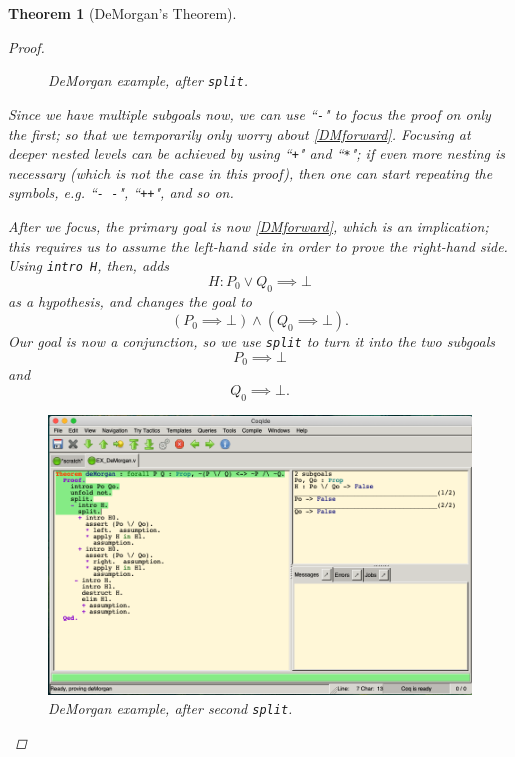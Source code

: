 \documentclass[12pt,notitlepage]{report}
\theoremstyle{plain}
\newtheorem{theo}{Theorem}[section]
\theoremstyle{definition}
\newcommand{\define}[1]{\emph{#1}\index{#1}}
\numberwithin{equation}{section}
\begin{document}
\begin{theo}[DeMorgan's Theorem]
\begin{proof}
\begin{figure}[H]
              \caption{DeMorgan example, after \texttt{split}.}
    \label{fig:demorgan1}
\end{figure}
        \par \medskip
        Since we have multiple subgoals now, we can use ``\texttt{-}" to \define{focus} the proof on only the first; so that we temporarily only worry about \eqref{DMforward}.  Focusing at deeper nested levels can be achieved by using ``\texttt{+}" and ``\texttt{*}"; if even more nesting is necessary (which is not the case in this proof), then one can start repeating the symbols, e.g. ``\texttt{-\,-}", ``\texttt{++}", and so on.
        \par After we focus, the primary goal is now \eqref{DMforward}, which is an implication; this requires us to assume the left-hand side in order to prove the right-hand side.  Using \texttt{intro H}, then, adds
        \[
            H : P_0 \lor Q_0 \implies \bot
        \]
        as a hypothesis, and changes the goal to 
        \[
            (P_0 \implies \bot) \land (Q_0 \implies \bot).
        \]
        Our goal is now a conjunction, so we use \texttt{split} to turn it into the two subgoals
        \begin{equation}\label{DMx1}
           P_0 \implies \bot
        \end{equation}
        and
        \begin{equation}\label{DMx2}
            Q_0 \implies \bot.
        \end{equation}
        \par \medskip
          \noindent
\begin{figure}[H]
    \centering
          \includegraphics[scale=0.45]{DeMorgan3}
              \caption{DeMorgan example, after second \texttt{split}.}

\end{figure}
\end{proof}
\end{theo}
\end{document}
